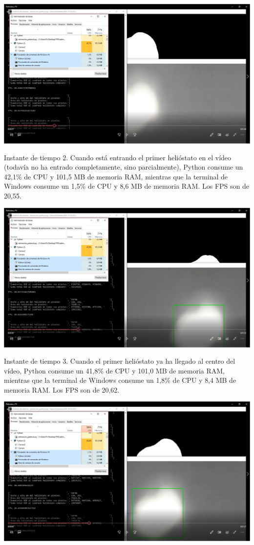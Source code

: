 \documentclass[12pt]{article}
\begin{document}
\includegraphics[width=\textwidth]{CapturasRendimientoSoftware2/Imagen2.png}

Instante de tiempo 2. Cuando está entrando el primer helióstato en el vídeo (todavía no ha entrado completamente, sino parcialmente), Python consume un 42,1\% de CPU y 101,5 MB de memoria RAM, mientras que la terminal de Windows consume un 1,5\% de CPU y 8,6 MB de memoria RAM. Los FPS son de 20,55.


\includegraphics[width=\textwidth]{CapturasRendimientoSoftware2/Imagen3.png}

Instante de tiempo 3. Cuando el primer helióstato ya ha llegado al centro del vídeo, Python consume un 41,8\% de CPU y 101,0 MB de memoria RAM, mientras que la terminal de Windows consume un 1,8\% de CPU y 8,4 MB de memoria RAM. Los FPS son de 20,62.


\includegraphics[width=\textwidth]{CapturasRendimientoSoftware2/Imagen4.png}
\end{document}
